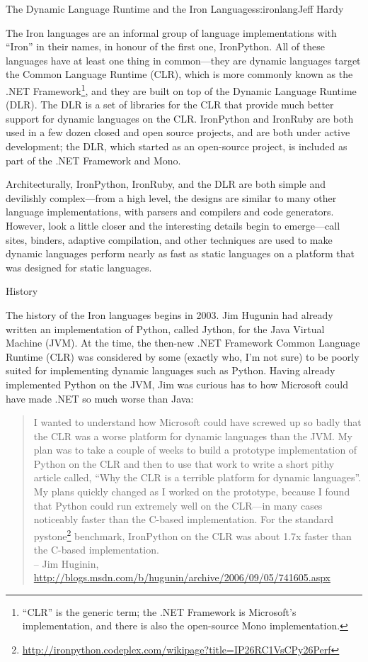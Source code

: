 \begin{aosachapter}{The Dynamic Language Runtime and the Iron Languages}{s:ironlang}{Jeff Hardy}

The Iron languages are an informal group of language implementations with
``Iron'' in their names, in honour of the first one, IronPython. All of these
languages have at least one thing in common---they are dynamic languages target
the Common Language Runtime (CLR), which is more commonly known as the .NET
Framework\footnote{``CLR'' is the generic term; the .NET Framework is
Microsoft's implementation, and there is also the open-source Mono
implementation.}, and they are built on top of the Dynamic Language Runtime
(DLR).  The DLR is a set of libraries for the CLR that provide much better
support for dynamic languages on the CLR. IronPython and IronRuby are both used
in a few dozen closed and open source projects, and are both under active
development; the DLR, which started as an open-source project, is included as
part of the .NET Framework and Mono.

Architecturally, IronPython, IronRuby, and the DLR are both simple and
devilishly complex---from a high level, the designs are similar to many other
language implementations, with parsers and compilers and code generators.
However, look a little closer and the interesting details begin to
emerge---call sites, binders, adaptive compilation, and other techniques are
used to make dynamic languages perform nearly as fast as static languages on a
platform that was designed for static languages. 

\begin{aosasect1}{History}

The history of the Iron languages begins in 2003. Jim Hugunin had already
written an implementation of Python, called Jython, for the Java Virtual
Machine (JVM). At the time, the then-new .NET Framework Common Language Runtime
(CLR) was considered by some (exactly who, I'm not sure) to be poorly suited
for implementing dynamic languages such as Python. Having already implemented
Python on the JVM, Jim was curious has to how Microsoft could have made .NET so
much worse than Java:

\begin{quotation}
I wanted to understand how Microsoft could have screwed up so badly that the
CLR was a worse platform for dynamic languages than the JVM.  My plan was to
take a couple of weeks to build a prototype implementation of Python on the CLR
and then to use that work to write a short pithy article called, ``Why the CLR
is a terrible platform for dynamic languages''.  My plans quickly changed as I
worked on the prototype, because I found that Python could run extremely well
on the CLR---in many cases noticeably faster than the C-based implementation.
For the standard
pystone\footnote{\url{http://ironpython.codeplex.com/wikipage?title=IP26RC1VsCPy26Perf}}
benchmark, IronPython on the CLR was about 1.7x faster than the C-based
implementation.\\ -- Jim Huginin,
\url{http://blogs.msdn.com/b/hugunin/archive/2006/09/05/741605.aspx}
\end{quotation}


\end{aosasect1}
\end{aosachapter}
